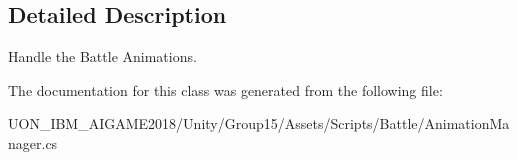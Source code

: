 \subsection{Detailed Description}
Handle the Battle Animations. 

The documentation for this class was generated from the following file\+:\begin{DoxyCompactItemize}
\item 
U\+O\+N\+\_\+\+I\+B\+M\+\_\+\+A\+I\+G\+A\+M\+E2018/\+Unity/\+Group15/\+Assets/\+Scripts/\+Battle/Animation\+Manager.\+cs\end{DoxyCompactItemize}
